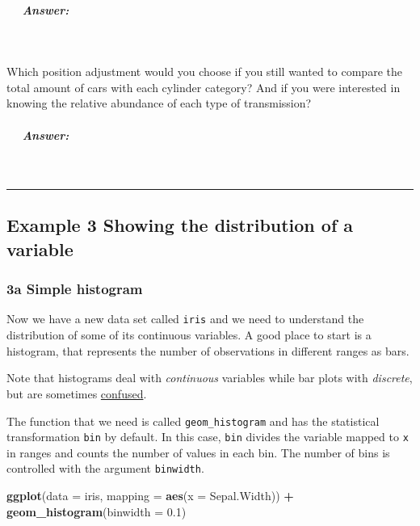 \documentclass[
]{article}
\newenvironment{Shaded}{\begin{snugshade}}{\end{snugshade}}
\newcommand{\AttributeTok}[1]{\textcolor[rgb]{0.13,0.29,0.53}{#1}}
\newcommand{\FloatTok}[1]{\textcolor[rgb]{0.00,0.00,0.81}{#1}}
\newcommand{\FunctionTok}[1]{\textcolor[rgb]{0.13,0.29,0.53}{\textbf{#1}}}
\newcommand{\NormalTok}[1]{#1}
\newcommand{\SpecialCharTok}[1]{\textcolor[rgb]{0.81,0.36,0.00}{\textbf{#1}}}
\begin{document}
\subparagraph{  Answer:}\label{answer-2}

 

Which position adjustment would you choose if you still wanted to
compare the total amount of cars with each cylinder category? And if you
were interested in knowing the relative abundance of each type of
transmission?

\subparagraph{  Answer:}\label{answer-3}

 

\begin{center}\rule{0.5\linewidth}{0.5pt}\end{center}

\subsection{\texorpdfstring{ \textbf{Example 3} \textbar{} Showing the
distribution of a
variable}{ Example 3 \textbar{} Showing the distribution of a variable}}\label{example-3-showing-the-distribution-of-a-variable}

\subsubsection{\texorpdfstring{\textbf{3a} \textbar{} Simple
histogram}{3a \textbar{} Simple histogram}}\label{a-simple-histogram}

Now we have a new data set called \texttt{iris} and we need to
understand the distribution of some of its continuous variables. A good
place to start is a histogram, that represents the number of
observations in different ranges as bars.

Note that histograms deal with \emph{continuous} variables while bar
plots with \emph{discrete}, but are sometimes
\href{https://www.google.com/search?q=histograms+and+bar+graphs+difference}{confused}.

The function that we need is called \texttt{geom\_histogram} and has the
statistical transformation \texttt{bin} by default. In this case,
\texttt{bin} divides the variable mapped to \texttt{x} in ranges and
counts the number of values in each bin. The number of bins is
controlled with the argument \texttt{binwidth}.

\begin{Shaded}
\begin{Highlighting}[]
\FunctionTok{ggplot}\NormalTok{(}\AttributeTok{data =}\NormalTok{ iris, }\AttributeTok{mapping =} \FunctionTok{aes}\NormalTok{(}\AttributeTok{x =}\NormalTok{ Sepal.Width)) }\SpecialCharTok{+}
  \FunctionTok{geom\_histogram}\NormalTok{(}\AttributeTok{binwidth =} \FloatTok{0.1}\NormalTok{)}
\end{Highlighting}
\end{Shaded}
\end{document}
